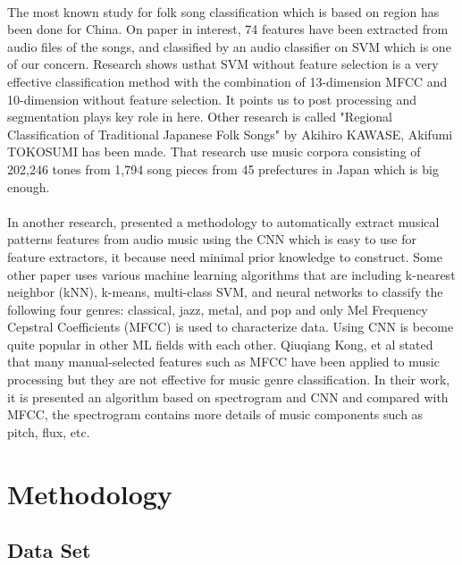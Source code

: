 \documentclass[10pt,twocolumn,letterpaper]{article}
\begin{document}
\paragraph{}The most known study for folk song classification which is based on region has been done for China. On paper in interest, 74 features have been extracted from audio files of the songs, and classified by an audio classifier on SVM which is one of our concern. Research shows usthat SVM without feature selection is a very effective classification method with the combination of 13-dimension MFCC and 10-dimension without feature selection. It points us to post processing and segmentation plays key role in here. Other research is called "Regional Classification of Traditional Japanese Folk Songs" by Akihiro KAWASE, Akifumi TOKOSUMI has been made. That research use music corpora consisting of 202,246 tones from 1,794 song pieces from 45 prefectures in Japan which is big enough.

\paragraph{}In another research\cite{feature_extraction_automatic_cnn}, presented a methodology to automatically extract musical patterns features from audio music using the CNN which is easy to use for feature extractors, it because need minimal prior knowledge to construct. Some other paper uses\cite{genre_classification} various machine learning algorithms that are including k-nearest neighbor (kNN), k-means, multi-class SVM, and neural networks to classify the following four genres: classical, jazz, metal, and pop and only Mel Frequency Cepstral Coefficients (MFCC) is used to characterize data.
Using CNN is become quite popular in other ML fields with each other. Qiuqiang Kong, et al\cite{genre_cnn} stated that many manual-selected features such as MFCC have been applied to music processing but they are not effective for music genre classification. In their work, it is presented an algorithm based on spectrogram and CNN and compared with MFCC, the spectrogram contains more details of music components such as pitch, flux, etc. 


\section{Methodology}

\subsection{Data Set}
\end{document}
